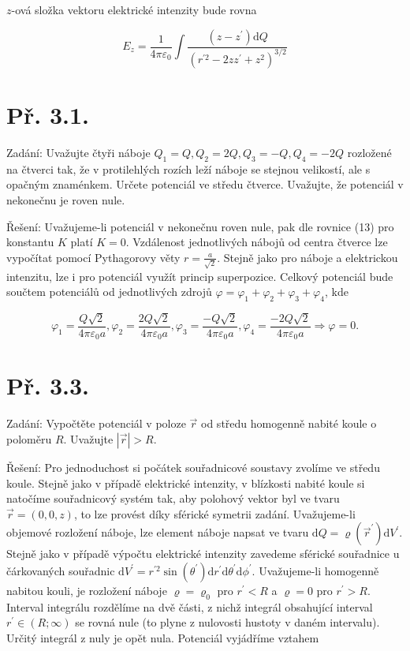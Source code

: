 \documentclass[czech,11pt,a4paper]{article}
\begin{document}
$z$-ová složka vektoru elektrické intenzity bude rovna

$$
E_{z}=\frac{1}{4 \pi \varepsilon_{0}} \int \frac{\left(z-z^{\prime}\right) \mathrm{d} Q}{\left(r^{\prime 2}-2 z z^{\prime}+z^{2}\right)^{3 / 2}}
$$

\section{Př. 3.1.}

Zadání: Uvažujte čtyři náboje $Q_{1}=Q, Q_{2}=2 Q, Q_{3}=-Q, Q_{4}=-2 Q$ rozložené na čtverci tak, že v protilehlých rozích leží náboje se stejnou velikostí, ale s opačným znaménkem. Určete potenciál ve středu čtverce. Uvažujte, že potenciál v nekonečnu je roven nule.





Řešení: Uvažujeme-li potenciál v nekonečnu roven nule, pak dle rovnice (13) pro konstantu $K$ platí $K=0$. Vzdálenost jednotlivých nábojů od centra čtverce lze vypočítat pomocí Pythagorovy věty $r=\frac{a}{\sqrt{2}}$. Stejně jako pro náboje a elektrickou intenzitu, lze i pro potenciál využít princip superpozice. Celkový potenciál bude součtem potenciálů od jednotlivých zdrojů $\varphi=\varphi_{1}+\varphi_{2}+\varphi_{3}+\varphi_{4}$, kde

$$
\varphi_{1}=\frac{Q \sqrt{2}}{4 \pi \varepsilon_{0} a}, \varphi_{2}=\frac{2 Q \sqrt{2}}{4 \pi \varepsilon_{0} a}, \varphi_{3}=\frac{-Q \sqrt{2}}{4 \pi \varepsilon_{0} a}, \varphi_{4}=\frac{-2 Q \sqrt{2}}{4 \pi \varepsilon_{0} a} \Rightarrow \varphi=0 .
$$

\section{Př. 3.3.}

Zadání: Vypočtěte potenciál v poloze $\vec{r}$ od středu homogenně nabité koule o poloměru $R$. Uvažujte $|\vec{r}|>R$.

Řešení: Pro jednoduchost si počátek souřadnicové soustavy zvolíme ve středu koule. Stejně jako v případě elektrické intenzity, v blízkosti nabité koule si natočíme souřadnicový systém tak, aby polohový vektor byl ve tvaru $\vec{r}=(0,0, z)$, to lze provést díky sférické symetrii zadání. Uvažujeme-li objemové rozložení náboje, lze element náboje napsat ve tvaru $\mathrm{d} Q=\varrho\left(\vec{r}^{\prime}\right) \mathrm{d} V^{\prime}$. Stejně jako v případě výpočtu elektrické intenzity zavedeme sférické souřadnice u čárkovaných souřadnic $\mathrm{d} V^{\prime}=r^{\prime 2} \sin \left(\theta^{\prime}\right) \mathrm{d} r^{\prime} \mathrm{d} \theta^{\prime} \mathrm{d} \phi^{\prime}$. Uvažujeme-li homogenně nabitou kouli, je rozložení náboje $\varrho=\varrho_{0}$ pro $r^{\prime}<R$ a $\varrho=0$ pro $r^{\prime}>R$. Interval integrálu rozdělíme na dvě části, z nichž integrál obsahující interval $r^{\prime} \in(R ; \infty)$ se rovná nule (to plyne z nulovosti hustoty $\mathrm{v}$ daném intervalu). Určitý integrál z nuly je opět nula. Potenciál vyjádříme vztahem
\end{document}
